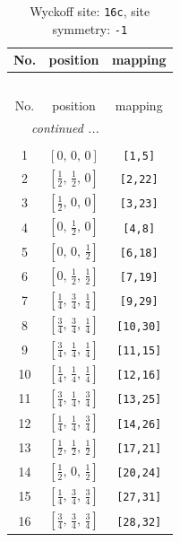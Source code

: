 \documentclass[fleqn,8pt]{jsarticle}
\begin{document}
\begin{longtable}{ccc}
\caption{Wyckoff site: {\tt 16c}, site symmetry: {\tt -1}}
 \\
 \hline \hline
No. & position & mapping \\ \hline \endfirsthead

\multicolumn{2}{l}{\tablename\ \thetable{}} \\
 \hline \hline
No. & position & mapping \\ \hline \endhead

 \hline \hline
\multicolumn{2}{r}{\footnotesize\it continued ...} \\ \endfoot

 \hline \hline
\multicolumn{2}{r}{} \\ \endlastfoot

1 & $\left[ 0,\, 0,\, 0 \right]$ & {\tt [1,5]} \\ \hline
2 & $\left[ \frac{1}{2},\, \frac{1}{2},\, 0 \right]$ & {\tt [2,22]} \\ \hline
3 & $\left[ \frac{1}{2},\, 0,\, 0 \right]$ & {\tt [3,23]} \\ \hline
4 & $\left[ 0,\, \frac{1}{2},\, 0 \right]$ & {\tt [4,8]} \\ \hline
5 & $\left[ 0,\, 0,\, \frac{1}{2} \right]$ & {\tt [6,18]} \\ \hline
6 & $\left[ 0,\, \frac{1}{2},\, \frac{1}{2} \right]$ & {\tt [7,19]} \\ \hline
7 & $\left[ \frac{1}{4},\, \frac{3}{4},\, \frac{1}{4} \right]$ & {\tt [9,29]} \\ \hline
8 & $\left[ \frac{3}{4},\, \frac{3}{4},\, \frac{1}{4} \right]$ & {\tt [10,30]} \\ \hline
9 & $\left[ \frac{3}{4},\, \frac{1}{4},\, \frac{1}{4} \right]$ & {\tt [11,15]} \\ \hline
10 & $\left[ \frac{1}{4},\, \frac{1}{4},\, \frac{1}{4} \right]$ & {\tt [12,16]} \\ \hline
11 & $\left[ \frac{3}{4},\, \frac{1}{4},\, \frac{3}{4} \right]$ & {\tt [13,25]} \\ \hline
12 & $\left[ \frac{1}{4},\, \frac{1}{4},\, \frac{3}{4} \right]$ & {\tt [14,26]} \\ \hline
13 & $\left[ \frac{1}{2},\, \frac{1}{2},\, \frac{1}{2} \right]$ & {\tt [17,21]} \\ \hline
14 & $\left[ \frac{1}{2},\, 0,\, \frac{1}{2} \right]$ & {\tt [20,24]} \\ \hline
15 & $\left[ \frac{1}{4},\, \frac{3}{4},\, \frac{3}{4} \right]$ & {\tt [27,31]} \\ \hline
16 & $\left[ \frac{3}{4},\, \frac{3}{4},\, \frac{3}{4} \right]$ & {\tt [28,32]} \\
\end{longtable}
\end{document}
